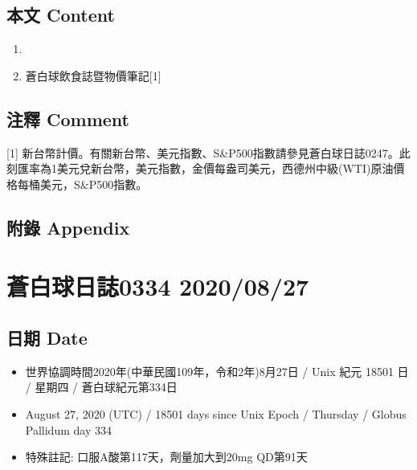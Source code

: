 \documentclass[
]{article}
\providecommand{\tightlist}{%
  \setlength{\itemsep}{0pt}\setlength{\parskip}{0pt}}
\begin{document}
\hypertarget{ux672cux6587-content-25}{%
\subsection{本文 Content}\label{ux672cux6587-content-25}}

\begin{enumerate}
\def\labelenumi{\arabic{enumi}.}
\tightlist
\item
\item
  蒼白球飲食誌暨物價筆記{[}1{]}
\end{enumerate}

\hypertarget{ux6ce8ux91cb-comment-25}{%
\subsection{注釋 Comment}\label{ux6ce8ux91cb-comment-25}}

{[}1{]}
新台幣計價。有關新台幣、美元指數、S\&P500指數請參見蒼白球日誌0247。此刻匯率為1美元兌新台幣，美元指數，金價每盎司美元，西德州中級(WTI)原油價格每桶美元，S\&P500指數。

\hypertarget{ux9644ux9304-appendix-25}{%
\subsection{附錄 Appendix}\label{ux9644ux9304-appendix-25}}

\hypertarget{ux84bcux767dux7403ux65e5ux8a8c0334-20200827}{%
\section{蒼白球日誌0334
2020/08/27}\label{ux84bcux767dux7403ux65e5ux8a8c0334-20200827}}

\hypertarget{ux65e5ux671f-date-26}{%
\subsection{日期 Date}\label{ux65e5ux671f-date-26}}

\begin{itemize}
\tightlist
\item
  世界協調時間2020年(中華民國109年，令和2年)8月27日 / Unix 紀元 18501 日
  / 星期四 / 蒼白球紀元第334日
\item
  August 27, 2020 (UTC) / 18501 days since Unix Epoch / Thursday /
  Globus Pallidum day 334
\item
  特殊註記: 口服A酸第117天，劑量加大到20mg QD第91天
\end{itemize}
\end{document}
